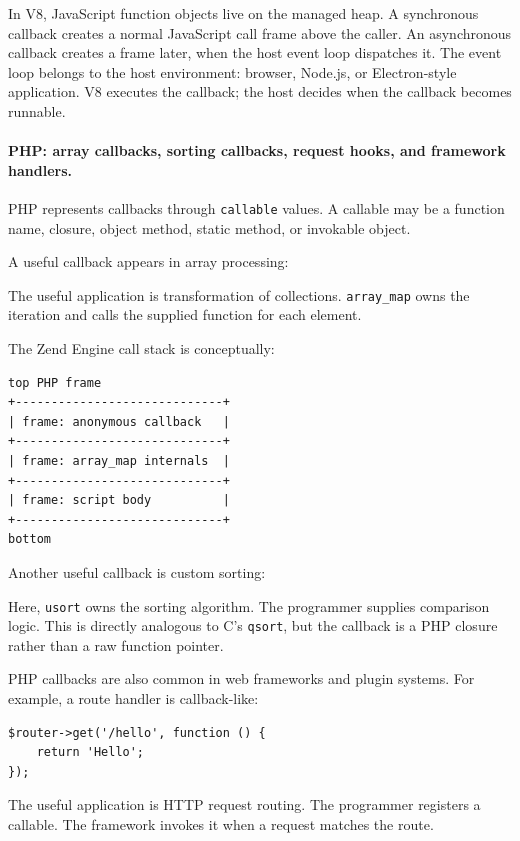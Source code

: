 In V8, JavaScript function objects live on the managed heap. A synchronous callback creates a normal JavaScript call frame above the caller. An asynchronous callback creates a frame later, when the host event loop dispatches it. The event loop belongs to the host environment: browser, Node.js, or Electron-style application. V8 executes the callback; the host decides when the callback becomes runnable.

\paragraph{PHP: array callbacks, sorting callbacks, request hooks, and framework handlers.}

PHP represents callbacks through \texttt{callable} values. A callable may be a function name, closure, object method, static method, or invokable object.

A useful callback appears in array processing:

The useful application is transformation of collections. \texttt{array\_map} owns the iteration and calls the supplied function for each element.

The Zend Engine call stack is conceptually:

\begin{verbatim}
top PHP frame
+-----------------------------+
| frame: anonymous callback   |
+-----------------------------+
| frame: array_map internals  |
+-----------------------------+
| frame: script body          |
+-----------------------------+
bottom
\end{verbatim}

Another useful callback is custom sorting:

Here, \texttt{usort} owns the sorting algorithm. The programmer supplies comparison logic. This is directly analogous to C's \texttt{qsort}, but the callback is a PHP closure rather than a raw function pointer.

PHP callbacks are also common in web frameworks and plugin systems. For example, a route handler is callback-like:

\begin{verbatim}
$router->get('/hello', function () {
    return 'Hello';
});
\end{verbatim}

The useful application is HTTP request routing. The programmer registers a callable. The framework invokes it when a request matches the route.

